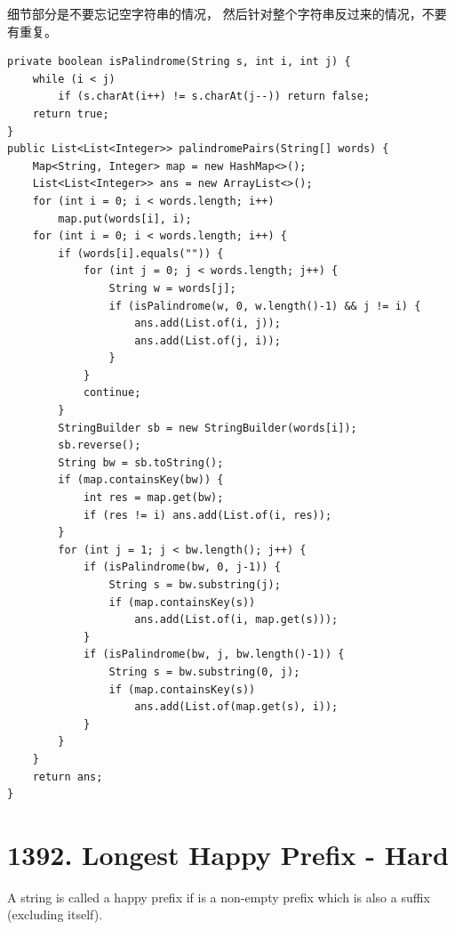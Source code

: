 \documentclass[9pt, b5paaper]{book}
\begin{document}
细节部分是不要忘记空字符串的情况， 然后针对整个字符串反过来的情况，不要有重复。
\begin{verbatim}
private boolean isPalindrome(String s, int i, int j) {
    while (i < j) 
        if (s.charAt(i++) != s.charAt(j--)) return false;
    return true;
}
public List<List<Integer>> palindromePairs(String[] words) {
    Map<String, Integer> map = new HashMap<>();
    List<List<Integer>> ans = new ArrayList<>();
    for (int i = 0; i < words.length; i++) 
        map.put(words[i], i);
    for (int i = 0; i < words.length; i++) {
        if (words[i].equals("")) {
            for (int j = 0; j < words.length; j++) {
                String w = words[j];
                if (isPalindrome(w, 0, w.length()-1) && j != i) {
                    ans.add(List.of(i, j));
                    ans.add(List.of(j, i));
                }
            }
            continue;
        }
        StringBuilder sb = new StringBuilder(words[i]);
        sb.reverse();
        String bw = sb.toString();
        if (map.containsKey(bw)) {
            int res = map.get(bw);
            if (res != i) ans.add(List.of(i, res));
        }
        for (int j = 1; j < bw.length(); j++) {
            if (isPalindrome(bw, 0, j-1)) {
                String s = bw.substring(j);
                if (map.containsKey(s))
                    ans.add(List.of(i, map.get(s)));
            }
            if (isPalindrome(bw, j, bw.length()-1)) {
                String s = bw.substring(0, j);
                if (map.containsKey(s))
                    ans.add(List.of(map.get(s), i));
            }
        }
    }
    return ans;
}
\end{verbatim}

\section{1392. Longest Happy Prefix - Hard}
\label{sec-3-3}
A string is called a happy prefix if is a non-empty prefix which is also a suffix (excluding itself).
\end{document}
